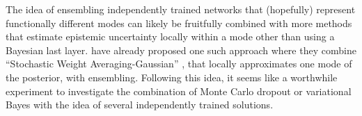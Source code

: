 \documentclass[../thesis.tex]{subfiles}
\begin{document}
The idea of ensembling independently trained networks that (hopefully) represent functionally different modes can likely be fruitfully combined with more methods that estimate epistemic uncertainty locally within a mode other than using a Bayesian last layer. \textcite{wilson2020bayesian} have already proposed one such approach where they combine ``Stochastic Weight Averaging-Gaussian'' \parencite{maddox2019simple}, that locally approximates one mode of the posterior, with ensembling. Following this idea, it seems like a worthwhile experiment to investigate the combination of Monte Carlo dropout or variational Bayes with the idea of several independently trained solutions.
% 
% 
% 
% 
% 
% 

% 
% 
% 
\end{document}
